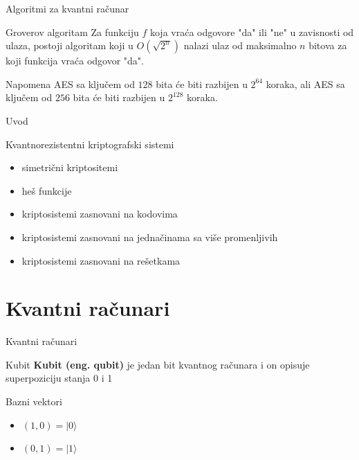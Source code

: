 \documentclass[aspectratio=1610]{beamer}
\newcommand{\ket}[1]{| #1 \rangle}
\begin{document}
\begin{frame}{Algoritmi za kvantni računar}
    \begin{block}{Groverov algoritam}
        Za funkciju $f$ koja vraća odgovore "da" ili "ne" u zavisnosti od ulaza, postoji algoritam koji u $O(\sqrt{2^n})$ nalazi ulaz od maksimalno $n$ bitova za koji funkcija vraća odgovor "da".
    \end{block}

    \begin{exampleblock}{Napomena}
        AES sa ključem od $128$ bita će biti razbijen u $2^{64}$ koraka, ali AES sa ključem od $256$ bita će biti razbijen u $2^{128}$ koraka.
    \end{exampleblock}
\end{frame}

\begin{frame}{Uvod}
    \begin{exampleblock}{Kvantnorezistentni kriptografski sistemi}
        \begin{itemize}
            \item simetrični kriptositemi
            \item heš funkcije
            \item kriptosistemi zasnovani na kodovima
            \item kriptosistemi zasnovani na jednačinama sa više promenljivih
            \item kriptosistemi zasnovani na rešetkama
        \end{itemize}
    \end{exampleblock}
\end{frame}

\section{Kvantni računari}
\begin{frame}{Kvantni računari}
   \begin{block}{Kubit}
       \textbf{Kubit (eng. qubit)} je jedan bit kvantnog računara i on opisuje superpoziciju stanja 0 i 1
   \end{block} 

   \begin{exampleblock}{Bazni vektori}
       \begin{itemize}
           \item $(1, 0) = \ket 0$
           \item $(0, 1) = \ket 1$
       \end{itemize}
   \end{exampleblock}
\end{frame}
\end{document}

